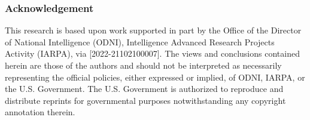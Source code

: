 \documentclass[10pt,twocolumn,letterpaper]{article}
\begin{document}
\subsubsection*{Acknowledgement}
This research is based upon work supported in part by the Office of the Director of National Intelligence (ODNI), Intelligence Advanced Research Projects Activity (IARPA), via [2022-21102100007]. The views and conclusions contained herein are those of the authors and should not be interpreted as necessarily representing the official policies, either expressed or implied, of ODNI, IARPA, or the U.S. Government. The U.S. Government is authorized to reproduce and distribute reprints for governmental purposes notwithstanding any copyright annotation therein. 
{\small


}
\end{document}
